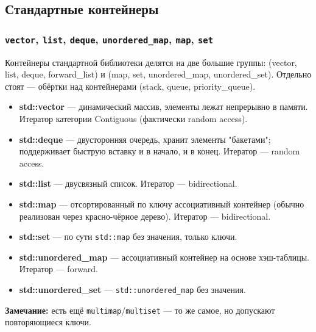\subsection{Стандартные контейнеры}
\subsubsection{\texttt{vector}, \texttt{list}, \texttt{deque}, \texttt{unordered\_map}, \texttt{map}, \texttt{set}}
Контейнеры стандартной библиотеки делятся на две большие группы:  (vector, list, deque, forward\_list) и  (map, set, unordered\_map, unordered\_set). Отдельно стоят  --- обёртки над контейнерами (stack, queue, priority\_queue).
\begin{itemize}
  \item \textbf{std::vector} --- динамический массив, элементы лежат непрерывно в памяти. Итератор категории Contiguous (фактически random access).
  \item \textbf{std::deque} --- двусторонняя очередь, хранит элементы "бакетами"; поддерживает быструю вставку и в начало, и в конец. Итератор --- random access.
  \item \textbf{std::list} --- двусвязный список. Итератор --- bidirectional.
  \item \textbf{std::map} --- отсортированный по ключу ассоциативный контейнер (обычно реализован через красно-чёрное дерево). Итератор --- bidirectional.
  \item \textbf{std::set} --- по сути \texttt{std::map} без значения, только ключи.
  \item \textbf{std::unordered\_map} --- ассоциативный контейнер на основе хэш-таблицы. Итератор --- forward.
  \item \textbf{std::unordered\_set} --- \texttt{std::unordered\_map} без значения.
\end{itemize}
\textbf{Замечание:} есть ещё \texttt{multimap}/\texttt{multiset} --- то же самое, но допускают повторяющиеся ключи.
